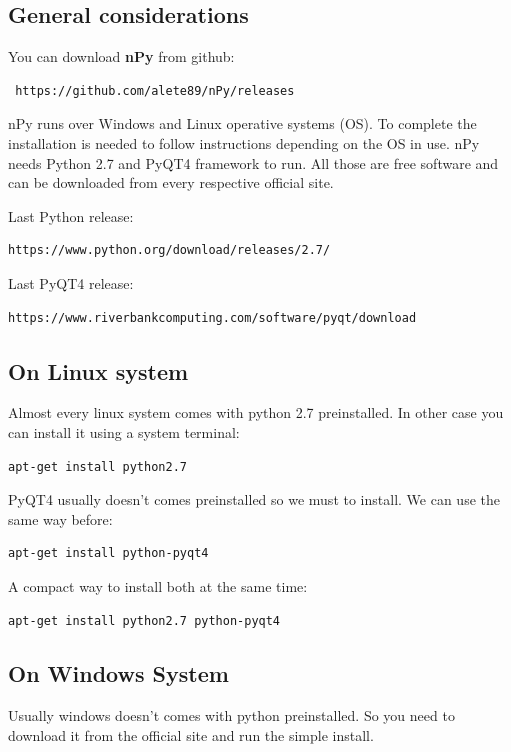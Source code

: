 \documentclass[a4paper,10pt]{article}
\begin{document}
\subsection{General considerations}

You can download \textbf{nPy} from github: 
\begin{verbatim}
 https://github.com/alete89/nPy/releases
\end{verbatim}

nPy runs over Windows and Linux operative systems (OS). To complete the installation is needed to follow instructions depending on the OS in use. nPy needs Python 2.7 and PyQT4 framework to run. All those are free software and can be downloaded from every respective official site.
\bigskip 

\noindent Last Python release: 
\begin{verbatim}
https://www.python.org/download/releases/2.7/
\end{verbatim}

\noindent Last PyQT4 release: \begin{verbatim}    
https://www.riverbankcomputing.com/software/pyqt/download
\end{verbatim}
  
\subsection{On Linux system}

Almost every linux system comes with python 2.7 preinstalled. In other case you can install it using a system terminal:
\begin{verbatim}
apt-get install python2.7
\end{verbatim}

\noindent PyQT4 usually doesn't comes preinstalled so we must to install. We can use the same way before:
\begin{verbatim}
apt-get install python-pyqt4 
\end{verbatim}

\noindent A compact way to install both at the same time:
\begin{verbatim}
apt-get install python2.7 python-pyqt4 
\end{verbatim}

\subsection{On Windows System}

Usually windows doesn't comes with python preinstalled. So you need to download it from the official site and run the simple install.
\end{document}
